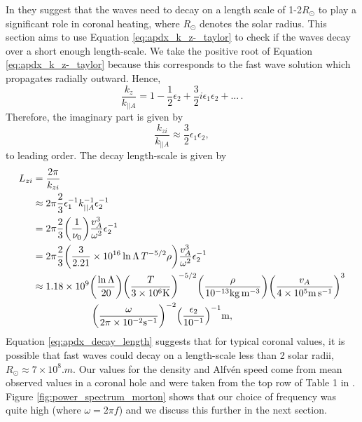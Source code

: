 In \citet{Withbroe1977,Parker1991} they suggest that the waves need to decay on a length scale of 1-2$R_\odot$ to play a significant role in coronal heating, where $R_\odot$ denotes the solar radius. This section aims to use Equation \eqref{eq:apdx_k_z-_taylor} to check if the waves decay over a short enough length-scale. We take the positive root of Equation \eqref{eq:apdx_k_z-_taylor} because this corresponds to the fast wave solution which propagates radially outward. Hence,
\begin{equation}
    \frac{k_z}{k_{||A}} = 1 - \frac{1}{2}\epsilon_2  + \frac{3}{2}i\epsilon_1\epsilon_2 + ...\,.
\end{equation}
Therefore, the imaginary part is given by
\begin{equation}
    \frac{k_{zi}}{k_{||A}} \approx \frac{3}{2}\epsilon_1\epsilon_2,
\end{equation}
to leading order.
The decay length-scale is given by
\begin{equation}
    \label{eq:apdx_decay_length}
    \begin{aligned}
    L_{zi} &= \frac{2\pi}{k_{zi}} \\
    &\approx 2\pi\frac{2}{3}\epsilon_1^{-1}k_{||A}^{-1}\epsilon_2^{-1} \\
    &= 2\pi\frac{2}{3}\qty(\frac{1}{\nu_0})\frac{v_A^3}{\omega^2}\epsilon_2^{-1} \\
    &= 2\pi\frac{2}{3}\qty(\frac{3}{2.21}\times10^{16}\ln\Lambda\, T^{-5/2}\rho)\frac{v_A^3}{\omega^2}\epsilon_2^{-1} \\
    &\approx 1.18\times10^9\qty(\frac{\ln \Lambda}{20})\qty(\frac{T}{3\times10^6\si{.K}})^{-5/2}\qty(\frac{\rho}{10^{-13}\si{.kg.m^{-3}}})\qty(\frac{v_A}{4\times10^5\si{.m.s^{-1}}})^3 \\
    &\qquad\qquad\qquad\qty(\frac{\omega}{2\pi\times10^{-2}\si{.s^{-1}}})^{-2}\qty(\frac{\epsilon_2}{10^{-1}})^{-1}\si{.m},
    \end{aligned}
\end{equation}
Equation \eqref{eq:apdx_decay_length} suggests that for typical coronal values, it is possible that fast waves could decay on a length-scale less than 2 solar radii, $R_\odot\approx 7\times10^8\si{.m}$. Our values for the density and Alfv\'en speed come from mean observed values in a coronal hole and were taken from the top row of Table 1 in \citet{Morton2016}. Figure \ref{fig:power_spectrum_morton} shows that our choice of frequency was quite high (where $\omega= 2\pi f$) and we discuss this further in the next section.

